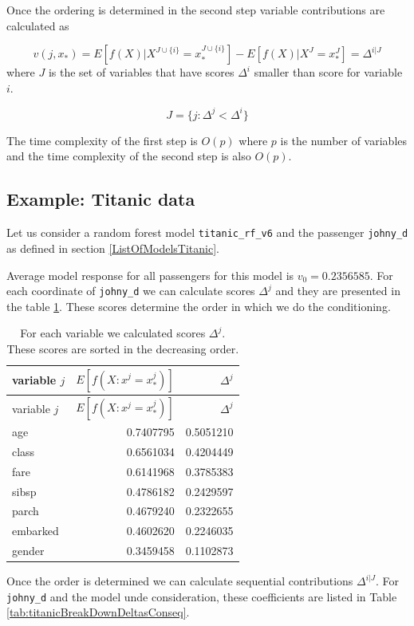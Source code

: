 \documentclass[12pt,]{krantz}
\theoremstyle{definition}
\theoremstyle{definition}
\theoremstyle{definition}
\theoremstyle{remark}
\begin{document}
Once the ordering is determined in the second step variable
contributions are calculated as

\[
v(j, x_*) = E [f(X) | X^{J \cup \{i\}} = x^{J \cup \{i\}}_*] - E [f(X) | X^{J} = x^{J}_*]  = \Delta ^{i|J}
\] where \(J\) is the set of variables that have scores \(\Delta^i\)
smaller than score for variable \(i\).

\[
J = \{j: \Delta^{j} < \Delta^{i}\}
\]

The time complexity of the first step is \(O(p)\) where \(p\) is the
number of variables and the time complexity of the second step is also
\(O(p)\).

\hypertarget{example-titanic-data}{%
\subsection{Example: Titanic data}\label{example-titanic-data}}

Let us consider a random forest model \texttt{titanic\_rf\_v6} and the
passenger \texttt{johny\_d} as defined in section
\ref{ListOfModelsTitanic}.

Average model response for all passengers for this model is
\(v_0 = 0.2356585\). For each coordinate of \texttt{johny\_d} we can
calculate scores \(\Delta^j\) and they are presented in the table
\ref{tab:titanicBreakDownDeltas}. These scores determine the order in
which we do the conditioning.

\begin{longtable}[]{@{}lrr@{}}
\caption{\label{tab:titanicBreakDownDeltas} For each variable we calculated
scores \(\Delta^j\). These scores are sorted in the decreasing
order.}\tabularnewline
\toprule
variable \(j\) & \(E[f(X : x^j = x^j_*)]\) & \(\Delta^j\)\tabularnewline
\midrule
\endfirsthead
\toprule
variable \(j\) & \(E[f(X : x^j = x^j_*)]\) & \(\Delta^j\)\tabularnewline
\midrule
\endhead
age & 0.7407795 & 0.5051210\tabularnewline
class & 0.6561034 & 0.4204449\tabularnewline
fare & 0.6141968 & 0.3785383\tabularnewline
sibsp & 0.4786182 & 0.2429597\tabularnewline
parch & 0.4679240 & 0.2322655\tabularnewline
embarked & 0.4602620 & 0.2246035\tabularnewline
gender & 0.3459458 & 0.1102873\tabularnewline
\bottomrule
\end{longtable}

Once the order is determined we can calculate sequential contributions
\(\Delta^{i|J}\). For \texttt{johny\_d} and the model unde
consideration, these coefficients are listed in Table
\ref{tab:titanicBreakDownDeltasConseq}.
\end{document}
